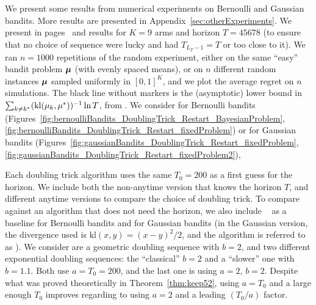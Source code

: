 \documentclass[12pt]{colt2018} %
\begin{document}
We present some results from numerical experiments on Bernoulli and Gaussian bandits. More results are presented in Appendix~\ref{sec:otherExperiments}. %
%
We present in pages~\pageref{fig:bernoulliBandits_DoublingTrick_Restart_BayesianProblem}
and \pageref{fig:bernoulliBandits_DoublingTrick_Restart_fixedProblem}
results for $K=9$ arms
and horizon $T=45678$ (to ensure that no choice of sequence were lucky and had $T_{L_T-1} = T$ or too close to it).
%
We ran $n=1000$ repetitions of the random experiment, either on the same  ``easy'' bandit problem $\boldsymbol{\mu}$ (with evenly spaced means),
or on $n$ different random instances $\boldsymbol{\mu}$ sampled uniformly in $[0,1]^K$,
and we plot the average regret on $n$ simulations.
%
The black line without markers is the (asymptotic) lower bound in $\sum_{k \neq k^*} (\mathrm{kl}(\mu_k, \mu^*))^{-1} \ln T$, from \cite{LaiRobbins85}.
We consider
\KLUCBpp{} for Bernoulli bandits (Figures~\ref{fig:bernoulliBandits_DoublingTrick_Restart_BayesianProblem}, \ref{fig:bernoulliBandits_DoublingTrick_Restart_fixedProblem})
or \AFHG{} for Gaussian bandits (Figures~\ref{fig:gaussianBandits_DoublingTrick_Restart_fixedProblem}, \ref{fig:gaussianBandits_DoublingTrick_Restart_fixedProblem2}),


Each doubling trick algorithm uses the same $T_0=200$ as a first guess for the horizon.
%
We include both the non-anytime version that knows the horizon $T$, and different anytime versions to compare the choice of doubling trick.
To compare against an algorithm that does not need the horizon,
we also include \KLUCB{}~\citep{KLUCBJournal} as a baseline for Bernoulli bandits and for Gaussian bandits (in the Gaussian version, the divergence used is $\mathrm{kl}(x,y)=(x-y)^2/2$, and the algorithm is referred to as \UCB{}).
%
We consider are a geometric doubling sequence with $b=2$, and two different exponential doubling sequences: the ``classical'' $b=2$ and a ``slower'' one with $b=1.1$. Both use $a=T_0=200$, and the last one is using $a=2$, $b=2$.
%
Despite what was proved theoretically in Theorem~\ref{thm:keep52}, using $a=T_0$ and a large enough $T_0$ improves regarding to using $a=2$ and a leading $(T_0/a)$ factor.
\end{document}
